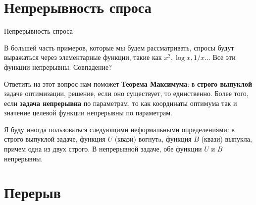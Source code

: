 \documentclass{beamer}
\begin{document}
\section{Непрерывность спроса}

\begin{frame}{Непрерывность спроса}

В большей часть примеров, которые мы будем рассматривать, спросы будут выражаться через элементарные функции, такие как $x^2, \log x, 1/x$... Все эти функции непрерывны. Совпадение?

Ответить на этот вопрос нам поможет \textbf{Теорема Максимума}: в \textbf{строго выпуклой} задаче оптимизации, решение, если оно существует, то единственно. Более того, если \textbf{задача непрерывна} по параметрам, то как координаты оптимума так и значение целевой функции непрерывны по параметрам.

Я буду иногда пользоваться следующими неформальными определениями: в строго выпуклой задаче, функция $U$ (квази) вогнутa, функция $B$ (квази) выпукла, причем одна из двух строго. В непрерывной задаче, обе функции $U$ и $B$ непрерывны.

\end{frame}

\section{Перерыв}
\end{document}

